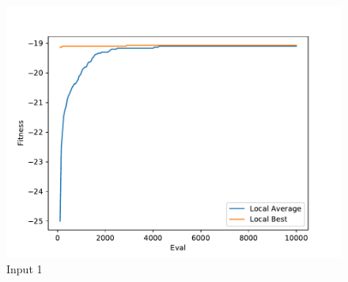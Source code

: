 \documentclass{standalone}
\begin{document}
\begin{figure}[!htb]
	\caption{Input 1}
	\label{fig:graph_1026}
	\includegraphics[width=\textwidth]{../graphs/graphs/1026.pdf}
\end{figure}
\end{document}

